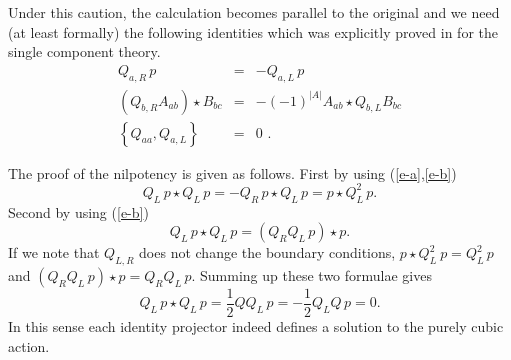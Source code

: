 \documentclass[a4paper,12pt]{article}
\begin{document}
Under this caution, the calculation becomes
parallel to the original  \cite{r-HLRS} and
we  need (at least formally) the following identities
which was explicitly proved in \cite{r-Romans} for the
single component theory.
\begin{eqnarray}
 Q_{a,R} \,p &=& -Q_{a,L} \, p\label{e-a}\\
 (Q_{b,R} A_{ab})\star B_{bc} & = & - (-1)^{|A|} A_{ab}
\star Q_{b,L} B_{bc}\label{e-b}\\
 \left\{Q_{aa}, Q_{a,L}\right\} & = & 0\label{e-c}\,\,.
\end{eqnarray}






The proof of the nilpotency is given as follows.
First by using (\ref{e-a},\ref{e-b})
\begin{equation}
Q_L \, p \star Q_L \, p= -Q_R \, p\star Q_L\, p  = 
p\star Q_L^2 \, p.
\end{equation}
Second by using (\ref{e-b})
\begin{equation}
 Q_L \, p \star Q_L \, p= (Q_R Q_L\,  p)\star p.
\end{equation}
If we note that $Q_{L,R}$ does not change the boundary conditions,
$p\star Q_L^2 \ p= Q_L^2 \, p$ and 
$(Q_R Q_L\,  p)\star p=Q_R Q_L\,  p$.  Summing up these two formulae gives
\begin{equation}
  Q_L \, p \star Q_L \, p=\frac{1}{2} Q Q_L\,  p=
-\frac{1}{2} Q_L Q \, p=0.
\end{equation}
In this sense each identity projector indeed defines
a solution to the purely cubic action.
\end{document}
